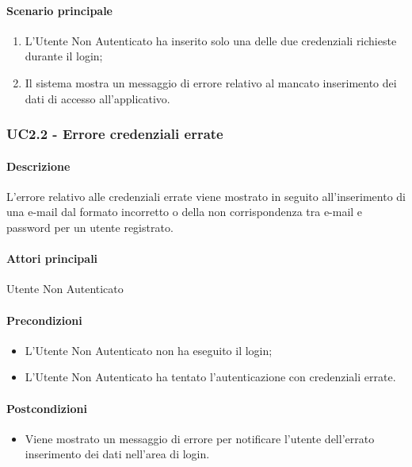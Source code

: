 \paragraph*{Scenario principale}
\begin{enumerate}
  \item L’Utente Non Autenticato ha inserito solo una delle due credenziali richieste durante il login;
  \item Il sistema mostra un messaggio di errore relativo al mancato inserimento dei dati di accesso all’applicativo.   
\end{enumerate}


\subsubsection{UC2.2 - Errore credenziali errate}\label{UC2point2}
\paragraph*{Descrizione}
L’errore relativo alle credenziali errate viene mostrato in seguito all’inserimento di una e-mail dal formato incorretto o della non corrispondenza tra e-mail e password per un utente registrato.

\paragraph*{Attori principali} Utente Non Autenticato

\paragraph*{Precondizioni}
\begin{itemize}
  \item L’Utente Non Autenticato non ha eseguito il login;
  \item L’Utente Non Autenticato ha tentato l’autenticazione con credenziali errate.  
\end{itemize}

\paragraph*{Postcondizioni}
\begin{itemize}
  \item Viene mostrato un messaggio di errore per notificare l’utente dell’errato inserimento dei dati nell’area di login.
\end{itemize}

